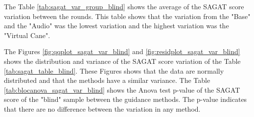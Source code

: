 
%

The Table \ref{tab:sagat_var_group_blind} shows the average of the SAGAT score variation between the rounds. This table shows that the variation from the "Base" and the "Audio" was the lowest variation and the highest variation was the "Virtual Cane".



The Figures \ref{fig:qqplot_sagat_var_blind} and \ref{fig:residplot_sagat_var_blind} shows the distribution and variance of the SAGAT score variation of the Table \ref{tab:sagat_table_blind}. These Figures shows that the data are normally distributed and that the methods have a similar variance.
The Table \ref{tab:blocanova_sagat_var_blind} shows the Anova test p-value of the SAGAT score of the "blind" sample between the guidance methods. The p-value indicates that there are no difference between the variation in any method. 



